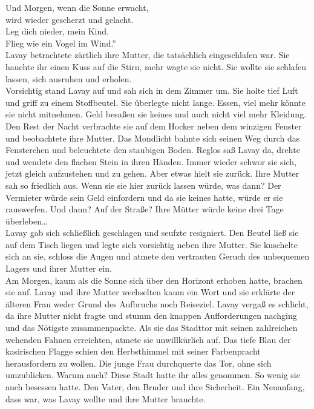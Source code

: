 Und Morgen, wenn die Sonne erwacht,\\
wird wieder gescherzt und gelacht. \\
Leg dich nieder, mein Kind.\\
Flieg wie ein Vogel im Wind.''\\
Lavay betrachtete zärtlich ihre Mutter, die tatsächlich eingeschlafen war. Sie hauchte ihr einen 
Kuss auf die Stirn, mehr wagte sie nicht. Sie wollte sie schlafen lassen, sich ausruhen und 
erholen. \\
Vorsichtig stand Lavay auf und sah sich in dem Zimmer um. Sie holte tief Luft und griff zu einem 
Stoffbeutel. Sie überlegte nicht lange. Essen, viel mehr könnte sie nicht mitnehmen. Geld besaßen 
sie keines und auch nicht viel mehr Kleidung. Den Rest der Nacht verbrachte sie auf dem Hocker neben 
dem winzigen Fenster und beobachtete ihre Mutter. Das Mondlicht bahnte sich seinen Weg durch das 
Fensterchen und beleuchtete den staubigen Boden. Reglos saß Lavay da, drehte und wendete den 
flachen Stein in ihren Händen. Immer wieder schwor sie sich, jetzt gleich aufzustehen und zu gehen. 
Aber etwas hielt sie zurück. Ihre Mutter sah so friedlich aus. Wenn sie sie hier zurück lassen 
würde, was dann? Der Vermieter würde sein Geld einfordern und da sie keines hatte, würde er sie 
rauswerfen. Und dann? Auf der Straße? Ihre Mütter würde keine drei Tage überleben…\\
Lavay gab sich schließlich geschlagen und seufzte resigniert. Den Beutel ließ sie auf dem Tisch 
liegen und legte sich vorsichtig neben ihre Mutter. Sie kuschelte sich an sie, schloss die Augen und 
atmete den vertrauten Geruch des unbequemen Lagers und ihrer Mutter ein. \\
Am Morgen, kaum als die Sonne sich über den Horizont erhoben hatte, brachen sie auf. Lavay und ihre 
Mutter wechselten kaum ein Wort und sie erklärte der älteren Frau weder Grund des Aufbruchs noch 
Reiseziel. Lavay vergaß es schlicht, da ihre Mutter nicht fragte und stumm den knappen 
Aufforderungen nachging und das Nötigste zusammenpackte. Als sie das Stadttor mit seinen 
zahlreichen wehenden Fahnen erreichten, atmete sie unwillkürlich auf. Das tiefe Blau der 
kasirischen Flagge schien den Herbsthimmel mit seiner Farbenpracht herausfordern zu wollen. Die 
junge Frau durchquerte das Tor, ohne sich umzublicken. Warum auch? Diese Stadt hatte ihr 
alles genommen. So wenig sie auch besessen hatte. Den Vater, den Bruder und ihre Sicherheit. Ein 
Neuanfang, dass war, was Lavay wollte und ihre Mutter brauchte.\\